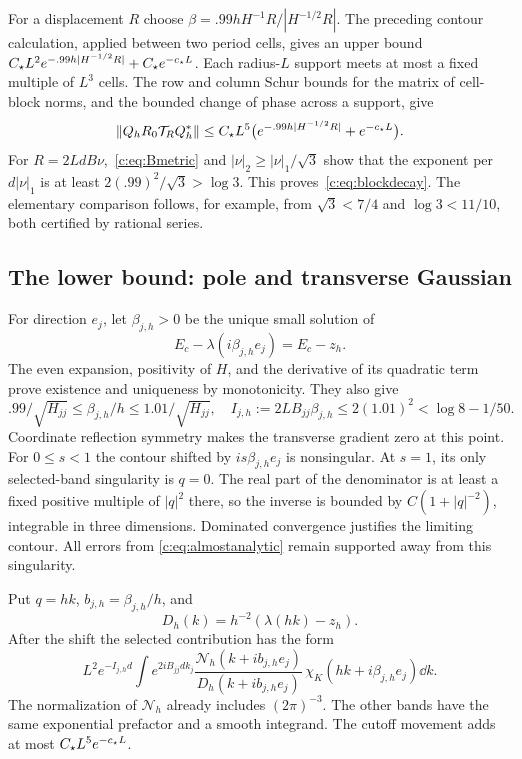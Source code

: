 For a displacement $R$ choose
$\beta=.99h H^{-1}R/|H^{-1/2}R|$. The preceding contour calculation,
applied between two period cells, gives an upper bound
$C_\star L^2e^{-.99h|H^{-1/2}R|}+C_\star e^{-c_\star L}$.
Each radius-$L$ support meets at most a fixed multiple of $L^3$ cells.
The row and column Schur bounds for the matrix of cell-block norms,
and the bounded change of phase across a support, give
\[
 \left\lVert Q_hR_0\mathcal T_RQ_h^*\right\rVert
 \le C_\star L^5\big(e^{-.99h|H^{-1/2}R|}+e^{-c_\star L}\big).
\]
For $R=2LdB\nu$,~\eqref{c:eq:Bmetric} and
$|\nu|_2\ge|\nu|_1/\sqrt3$ show that the exponent per $d|\nu|_1$ is at least
$2(.99)^2/\sqrt3>\log3$. This proves~\eqref{c:eq:blockdecay}.
The elementary comparison follows, for example, from
$\sqrt3<7/4$ and $\log3<11/10$, both certified by rational series.

\subsection{The lower bound: pole and transverse Gaussian}
For direction $e_j$, let $\beta_{j,h}>0$ be the unique small solution of
\begin{equation}
 E_c-\lambda(i\beta_{j,h}e_j)=E_c-z_h.
                                                               \label{c:eq:betaroot}
\end{equation}
The even expansion, positivity of $H$, and the derivative of its
quadratic term prove existence and uniqueness by monotonicity. They also
give
\begin{equation}
 .99/\sqrt{H_{jj}}\le\beta_{j,h}/h\le1.01/\sqrt{H_{jj}},
 \quad I_{j,h}:=2LB_{jj}\beta_{j,h}
 \le2(1.01)^2<\log8-1/50.                            \label{c:eq:action}
\end{equation}
Coordinate reflection symmetry makes the transverse gradient zero at
this point. For $0\le s<1$ the contour shifted by
$is\beta_{j,h}e_j$ is nonsingular. At $s=1$, its only selected-band
singularity is $q=0$. The real part of the denominator is at least a
fixed positive multiple of $|q|^2$ there, so the inverse is bounded by
$C(1+|q|^{-2})$, integrable in three dimensions. Dominated convergence
justifies the limiting contour. All errors from
\eqref{c:eq:almostanalytic} remain supported away from this singularity.

Put $q=hk$, $b_{j,h}=\beta_{j,h}/h$, and
\[
 D_h(k)=h^{-2}(\lambda(hk)-z_h).
\]
After the shift the selected contribution has the form
\begin{equation}
 L^2e^{-I_{j,h}d}
 \int e^{2iB_{jj}dk_j}
 \frac{\mathcal N_h(k+ib_{j,h}e_j)}
 {D_h(k+ib_{j,h}e_j)}\,
 \chi_K(hk+i\beta_{j,h}e_j)\dd k.                   \label{c:eq:scaledgreen}
\end{equation}
The normalization of $\mathcal N_h$ already includes $(2\pi)^{-3}$.
The other bands have the same exponential prefactor and a smooth
integrand. The cutoff movement adds at most $C_\star L^5e^{-c_\star L}$.

